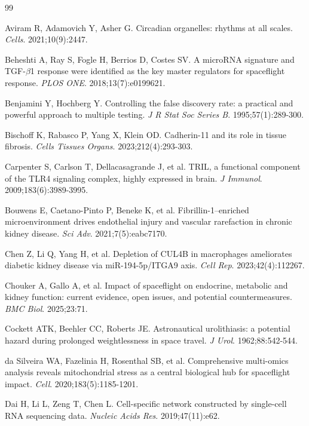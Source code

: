 \documentclass[11pt]{article}
\begin{document}
\begin{thebibliography}{99}\small

 Aviram R, Adamovich Y, Asher G. Circadian organelles: rhythms at all scales. \emph{Cells}. 2021;10(9):2447.

 Beheshti A, Ray S, Fogle H, Berrios D, Costes SV. A microRNA signature and TGF-$\beta$1 response were identified as the key master regulators for spaceflight response. \emph{PLOS ONE}. 2018;13(7):e0199621.

 Benjamini Y, Hochberg Y. Controlling the false discovery rate: a practical and powerful approach to multiple testing. \emph{J R Stat Soc Series B}. 1995;57(1):289-300.

 Bischoff K, Rabasco P, Yang X, Klein OD. Cadherin-11 and its role in tissue fibrosis. \emph{Cells Tissues Organs}. 2023;212(4):293-303.

 Carpenter S, Carlson T, Dellacasagrande J, et al. TRIL, a functional component of the TLR4 signaling complex, highly expressed in brain. \emph{J Immunol}. 2009;183(6):3989-3995.

 Bouwens E, Caetano-Pinto P, Beneke K, et al. Fibrillin-1--enriched microenvironment drives endothelial injury and vascular rarefaction in chronic kidney disease. \emph{Sci Adv}. 2021;7(5):eabc7170.

 Chen Z, Li Q, Yang H, et al. Depletion of CUL4B in macrophages ameliorates diabetic kidney disease via miR-194-5p/ITGA9 axis. \emph{Cell Rep}. 2023;42(4):112267.

 Chouker A, Gallo A, et al. Impact of spaceflight on endocrine, metabolic and kidney function: current evidence, open issues, and potential countermeasures. \emph{BMC Biol}. 2025;23:71.

 Cockett ATK, Beehler CC, Roberts JE. Astronautical urolithiasis: a potential hazard during prolonged weightlessness in space travel. \emph{J Urol}. 1962;88:542-544.

 da Silveira WA, Fazelinia H, Rosenthal SB, et al. Comprehensive multi-omics analysis reveals mitochondrial stress as a central biological hub for spaceflight impact. \emph{Cell}. 2020;183(5):1185-1201.

 Dai H, Li L, Zeng T, Chen L. Cell-specific network constructed by single-cell RNA sequencing data. \emph{Nucleic Acids Res}. 2019;47(11):e62.


\end{thebibliography}
\end{document}
